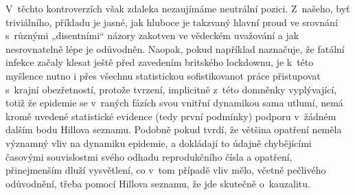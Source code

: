 V~těchto kontroverzích však zdaleka nezaujímáme neutrální pozici. Z~našeho, byť triviálního, příkladu je jasné, jak hluboce je takzvaný hlavní proud ve srovnání s~různými „disentními“
názory zakotven ve vědeckém uvažování a jak nesrovnatelně lépe je
odůvodněn. Naopak, pokud například \cite{wood2021inferring} naznačuje, že fatální infekce
začaly klesat ještě před zavedením britského lockdownu, je k~této
myšlence nutno i přes všechnu statistickou sofistikovanot práce přistupovat
s~krajní o\-be\-zřet\-nos\-tí, protože tvrzení, implicitně z~této domněnky
vyplývající, totiž že epidemie se v~raných fázích svou vnitřní dynamikou
sama utlumí, nemá kromě uvedené statistické evidence (tedy první podmínky) podporu v~žádném dalším bodu Hillova seznamu. Podobně pokud \cite{KomarekStraka2021} tvrdí, že většina opatření neměla významný vliv na dynamiku epidemie, a dokládají to údajně chybějícími časovými souvislostmi svého odhadu reprodukčního čísla a opatření, přinejmenším dluží vysvětlení, co v~tom případě vliv mělo, včetně pečlivého odůvodnění, třeba pomocí Hillova seznamu, že jde skutečně o~kauzalitu.
